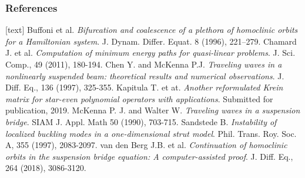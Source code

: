 \documentclass[16pt]{beamer}
\begin{document}
\begin{frame}
\frametitle{References}
      \fontsize{10}{7.2}\selectfont
      \begin{thebibliography}{9}
      [text]
       Buffoni et al. \emph{Bifurcation and coalescence of a plethora of homoclinic orbits for a Hamiltonian system}. J. Dynam. Differ. Equat. 8 (1996), 221–279.
       Chamard J. et al. \emph{Computation of minimum energy paths for quasi-linear problems}. J. Sci. Comp., 49 (2011), 180-194.
       Chen Y. and McKenna P.J. \emph{Traveling waves in a nonlinearly suspended beam: theoretical results and numerical observations}. J. Diff. Eq., 136 (1997), 325-355. Kapitula T. et at. \emph{Another reformulated Krein matrix for star-even polynomial operators with applications}. Submitted for publication, 2019.
       McKenna P. J. and Walter W. \emph{Traveling waves in a suspension bridge}. SIAM J. Appl. Math 50 (1990), 703-715.
       Sandstede B. \emph{Instability of localized buckling modes in a one-dimensional strut model}. Phil. Trans. Roy. Soc. A, 355 (1997), 2083-2097.
       van den Berg J.B. et al. \emph{Continuation of homoclinic orbits in the suspension bridge equation: A computer-assisted proof}. J. Diff. Eq., 264 (2018), 3086-3120.
      \end{thebibliography}
\end{frame}
\end{document}
